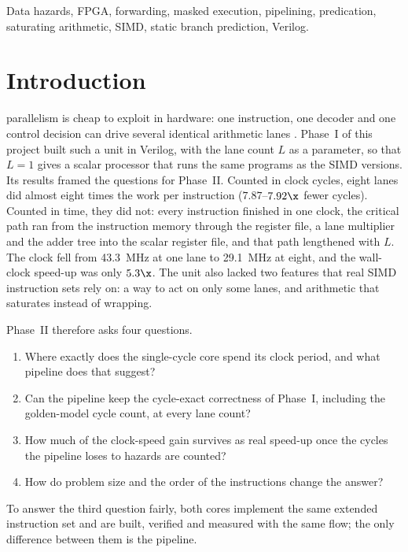 \begin{IEEEkeywords}
Data hazards, FPGA, forwarding, masked execution, pipelining, predication,
saturating arithmetic, SIMD, static branch prediction, Verilog.
\end{IEEEkeywords}

\section{Introduction}
 parallelism is cheap to exploit in hardware: one
instruction, one decoder and one control decision can drive several identical
arithmetic lanes \cite{flynn72, hp6}. Phase~I of this project built such a unit in
Verilog, with the lane count $L$ as a parameter, so that $L = 1$ gives a scalar
processor that runs the same programs as the SIMD versions. Its results framed the
questions for Phase~II. Counted in clock cycles, eight lanes did almost eight times
the work per instruction ($7.87$--$7.92\x$ fewer cycles). Counted in time, they did
not: every instruction finished in one clock, the critical path ran from the
instruction memory through the register file, a lane multiplier and the adder tree
into the scalar register file, and that path lengthened with $L$. The clock fell from
43.3~MHz at one lane to 29.1~MHz at eight, and the wall-clock speed-up was only
$5.3\x$. The unit also lacked two features that real SIMD instruction sets rely on:
a way to act on only some lanes, and arithmetic that saturates instead of wrapping.

Phase~II therefore asks four questions.
\begin{enumerate}
\item Where exactly does the single-cycle core spend its clock period, and what
      pipeline does that suggest?
\item Can the pipeline keep the cycle-exact correctness of Phase~I, including the
      golden-model cycle count, at every lane count?
\item How much of the clock-speed gain survives as real speed-up once the cycles
      the pipeline loses to hazards are counted?
\item How do problem size and the order of the instructions change the answer?
\end{enumerate}

To answer the third question fairly, both cores implement the same extended
instruction set and are built, verified and measured with the same flow; the only
difference between them is the pipeline.

